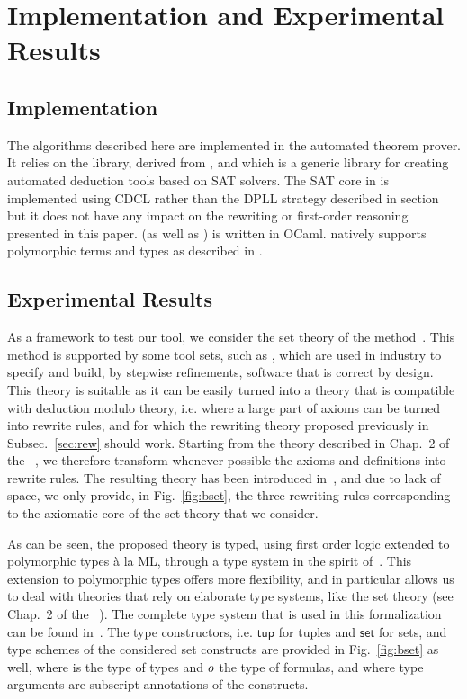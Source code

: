 
\section{Implementation and Experimental Results}
\label{sec:bench}

\subsection{Implementation}

The algorithms described here are implemented in the
\archsat{} automated theorem prover. It relies on the
\msat{}\cite{mSAT} library, derived from \altergoz{}, and which is a
generic library for creating automated deduction tools based on SAT
solvers. The SAT core in \msat{} is implemented using CDCL rather
than the DPLL strategy described in section\label{sec:smt} but it
does not have any impact on the rewriting or first-order reasoning
presented in this paper. \archsat{} (as well as \msat{}) is written
in OCaml. \archsat{} natively supports polymorphic terms and types
as described in \cite{BP13}.

\subsection{Experimental Results}

As a framework to test our tool, we consider the set theory of the \bmth{}
method~\cite{B-Book}. This method is supported by some tool sets, such as
\atelierb{}, which are used in industry to specify and build, by stepwise
refinements, software that is correct by design. This theory is suitable as it
can be easily turned into a theory that is compatible with deduction modulo
theory, i.e. where a large part of axioms can be turned into rewrite rules, and
for which the rewriting theory proposed previously in Subsec.~\ref{sec:rew}
should work. Starting from the theory described in Chap.~2 of the
\bbook{}~\cite{B-Book}, we therefore transform whenever possible the axioms and
definitions into rewrite rules. The resulting theory has been introduced
in~\cite{BA15}, and due to lack of space, we only provide, in
Fig.~\ref{fig:bset}, the three rewriting rules corresponding to the axiomatic
core of the \bmth{} set theory that we consider.

As can be seen, the proposed theory is typed, using first order logic extended
to polymorphic types à la ML, through a type system in the spirit
of~\cite{BP13}. This extension to polymorphic types offers more flexibility, and
in particular allows us to deal with theories that rely on elaborate type
systems, like the \bmth{} set theory (see Chap.~2 of the
\bbook{}~\cite{B-Book}). The complete type system that is used in this
formalization can be found in~\cite{BA15}. The type constructors,
i.e. $\mathsf{tup}$ for tuples and $\mathsf{set}$ for sets, and type schemes of
the considered set constructs are provided in Fig.~\ref{fig:bset} as well, where
\type{} is the type of types and $o$ the type of formulas, and where type
arguments are subscript annotations of the constructs.

